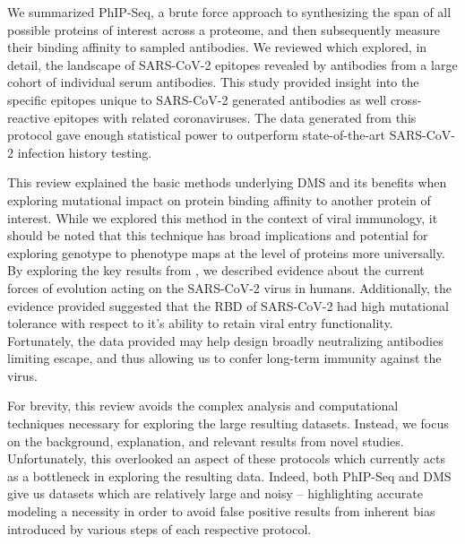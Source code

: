 \documentclass{article}
\begin{document}
We summarized PhIP-Seq, a brute force approach to synthesizing the span of all possible proteins of interest across a proteome, and then subsequently measure their binding affinity to sampled antibodies.
We reviewed \citet{Shrock2020} which explored, in detail, the landscape of SARS-CoV-2 epitopes revealed by antibodies from a large cohort of individual serum antibodies.
This study provided insight into the specific epitopes unique to SARS-CoV-2 generated antibodies as well cross-reactive epitopes with related coronaviruses.
The data generated from this protocol gave enough statistical power to outperform state-of-the-art SARS-CoV-2 infection history testing.

This review explained the basic methods underlying DMS and its benefits when exploring mutational impact on protein binding affinity to another protein of interest.
While we explored this method in the context of viral immunology, it should be noted that this technique has broad implications and potential for exploring genotype to phenotype maps at the level of proteins more universally.
By exploring the key results from \citet{Starr2020}, we described evidence about the current forces of evolution acting on the SARS-CoV-2 virus in humans.
Additionally, the evidence provided suggested that the RBD of SARS-CoV-2 had high mutational tolerance with respect to it's ability to retain viral entry functionality.
Fortunately, the data provided may help design broadly neutralizing antibodies limiting escape, and thus allowing us to confer long-term immunity against the virus.

For brevity, this review avoids the complex analysis and computational techniques necessary for exploring the large resulting datasets.
Instead, we focus on the background, explanation, and relevant results from novel studies.
Unfortunately, this overlooked an aspect of these protocols which currently acts as a bottleneck in exploring the resulting data.
Indeed, both PhIP-Seq and DMS give us datasets which are relatively large and noisy -- highlighting accurate modeling a necessity in order to avoid false positive results from inherent bias introduced by various steps of each respective protocol.
\end{document}
